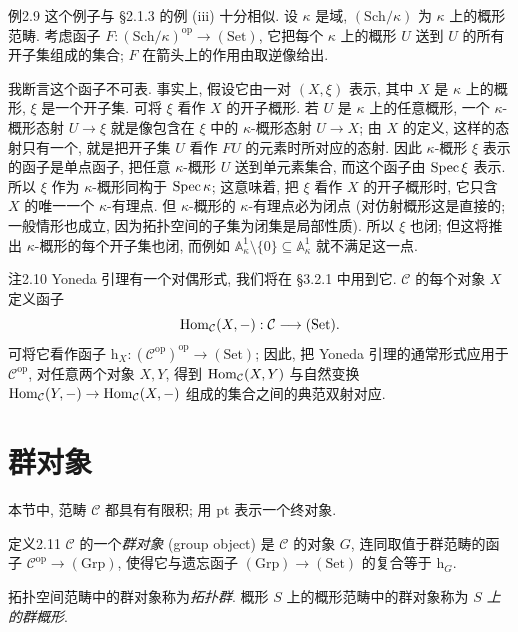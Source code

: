 \begin{origstatement}{例}{2.9}\label{ch02:ex29}
这个例子与 §2.1.3 的例 (iii) 十分相似. 设 $\kappa$ 是域, $(\mathrm{Sch}/\kappa)$ 为 $\kappa$ 上的概形范畴. 考虑函子 $F:(\mathrm{Sch}/\kappa)^{\mathrm{op}}\to(\mathrm{Set})$, 它把每个 $\kappa$ 上的概形 $U$ 送到 $U$ 的所有开子集组成的集合; $F$ 在箭头上的作用由取逆像给出.

我断言这个函子不可表. 事实上, 假设它由一对 $(X,\xi)$ 表示, 其中 $X$ 是 $\kappa$ 上的概形, $\xi$ 是一个开子集. 可将 $\xi$ 看作 $X$ 的开子概形. 若 $U$ 是 $\kappa$ 上的任意概形, 一个 $\kappa$-概形态射 $U\to\xi$ 就是像包含在 $\xi$ 中的 $\kappa$-概形态射 $U\to X$; 由 $X$ 的定义, 这样的态射只有一个, 就是把开子集 $U$ 看作 $FU$ 的元素时所对应的态射. 因此 $\kappa$-概形 $\xi$ 表示的函子是单点函子, 把任意 $\kappa$-概形 $U$ 送到单元素集合, 而这个函子由 $\operatorname{Spec}\xi$ 表示. 所以 $\xi$ 作为 $\kappa$-概形同构于 $\operatorname{Spec}\kappa$; 这意味着, 把 $\xi$ 看作 $X$ 的开子概形时, 它只含 $X$ 的唯一一个 $\kappa$-有理点. 但 $\kappa$-概形的 $\kappa$-有理点必为闭点 (对仿射概形这是直接的; 一般情形也成立, 因为拓扑空间的子集为闭集是局部性质). 所以 $\xi$ 也闭; 但这将推出 $\kappa$-概形的每个开子集也闭, 而例如 $\mathbb A^1_\kappa\setminus\{0\}\subseteq\mathbb A^1_\kappa$ 就不满足这一点.
\end{origstatement}

\begin{origstatement}{注}{2.10}\label{ch02:rem210}
Yoneda 引理有一个对偶形式, 我们将在 §3.2.1 中用到它. $\mathcal C$ 的每个对象 $X$ 定义函子
\[
\operatorname{Hom}_{\mathcal C}(X,-):\mathcal C\longrightarrow(\mathrm{Set}).
\]
可将它看作函子 $\mathrm h_X:(\mathcal C^{\mathrm{op}})^{\mathrm{op}}\to(\mathrm{Set})$; 因此, 把 Yoneda 引理的通常形式应用于 $\mathcal C^{\mathrm{op}}$, 对任意两个对象 $X,Y$, 得到 $\operatorname{Hom}_{\mathcal C}(X,Y)$ 与自然变换 $\operatorname{Hom}_{\mathcal C}(Y,-)\to\operatorname{Hom}_{\mathcal C}(X,-)$ 组成的集合之间的典范双射对应.
\end{origstatement}

\section{群对象}\label{ch02:sec22}
本节中, 范畴 $\mathcal C$ 都具有有限积; 用 $\mathrm{pt}$ 表示一个终对象.

\begin{origstatement}{定义}{2.11}\label{ch02:def211}
$\mathcal C$ 的一个\emph{群对象} (group object) 是 $\mathcal C$ 的对象 $G$, 连同取值于群范畴的函子 $\mathcal C^{\mathrm{op}}\to(\mathrm{Grp})$, 使得它与遗忘函子 $(\mathrm{Grp})\to(\mathrm{Set})$ 的复合等于 $\mathrm h_G$.

拓扑空间范畴中的群对象称为\emph{拓扑群}. 概形 $S$ 上的概形范畴中的群对象称为 \emph{$S$ 上的群概形}.
\end{origstatement}

